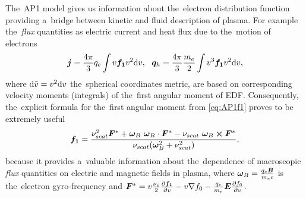 The~AP1 model gives us information about the~electron distribution function 
providing a~bridge between kinetic and fluid description of 
plasma. For example the~\textit{flux} quantities as 
electric current and heat flux due to the~motion of electrons
\begin{equation}
  \boldsymbol{j} = \frac{4\pi}{3}q_e \int v {\boldsymbol{f_1}} v^2\text{d}v,~~ 
  \boldsymbol{q}_h = \frac{4\pi}{3}\frac{m_e}{2} \int v^3 {\boldsymbol{f_1}} v^2\text{d}v,
  \nonumber
\end{equation}
where $\text{d}\tilde{v} = v^2\text{d}v$ 
the~spherical coordinates metric,
are based on corresponding velocity moments (integrals) of the~first angular 
moment of EDF. Consequently, the~explicit formula for the~first angular moment
from \eqref{eq:AP1f1} 
proves to be extremely useful
\begin{equation}
  {\boldsymbol{f_1}} = \frac{\nu_{scat}^2 \boldsymbol{F}^* + \boldsymbol{\omega}_{B}~\boldsymbol{\omega}_{B}\cdot\boldsymbol{F}^* 
  - \nu_{scat}~\boldsymbol{\omega}_{B} \boldsymbol{\times} \boldsymbol{F}^*}{\nu_{scat} (\boldsymbol{\omega}_{B}^2 + \nu_{scat}^2)}
  ,
  \label{eq:f1_explicit}
\end{equation} 
because it provides a~valuable 
information about the~dependence of macroscopic \textit{flux} quantities on
electric and magnetic fields in plasma, 
where $\boldsymbol{\omega}_{B} = \frac{q_e\boldsymbol{B}}{m_e c}$ is the~electron gyro-frequency and 
$\boldsymbol{F}^* = v\frac{\nu_{e}}{2}\frac{\partial{{\boldsymbol{f_1}}}}{\partial{v}} - v\nabla f_0 
 - \frac{q_e}{m_e}\boldsymbol{E}\frac{\partial{f_0}}{\partial{v}}$.

